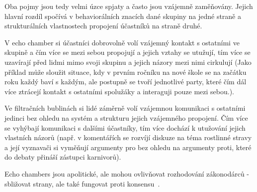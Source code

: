     Oba pojmy jsou tedy velmi úzce spjaty a často jsou vzájemně zaměňovány. Jejich hlavní rozdíl spočívá v behaviorálních znacích dané skupiny na jedné straně a strukturálních vlastnostech propojení účastníků na straně druhé.~\citep{Bruns17}
    
    \setlength\parskip{0mm}
    
    V echo chamber si účastníci dobrovolně volí vzájemný kontakt s ostatními ve skupině a čím více se mezi sebou propojují a jejich vztahy se utužují, tím více se uzavírají před lidmi mimo svoji skupinu a jejich názory mezi nimi cirkulují (Jako příklad může sloužit situace, kdy v prvním ročníku na nové škole se na začátku roku každý baví s každým, ale postupně se tvoří jednotlivé party, které čím dál více ztrácejí kontakt s ostatními spolužáky a interaguji pouze mezi sebou.).~\citep{Bruns17}
    
    Ve filtračních bublinách si lidé záměrně volí vzájemnou komunikaci s ostatními jedinci bez ohledu na systém a strukturu jejich vzájemného propojení. Čím více se vyhýbají komunikaci s dalšími účastníky, tím více dochází k utužování jejich vlastních názorů (např. v komentářích se rozvíjí diskuze na téma rostlinné stravy a její vyznavači si vyměňují argumenty pro bez ohledu na argumenty proti, které do debaty přináší zástupci karnivorů).~\citep{Bruns17}
    
    Echo chambers jsou apolitické, ale mohou ovlivňovat rozhodování zákonodárců - sbližovat strany, ale také fungovat proti konsensu~\cite{Jasny}.




